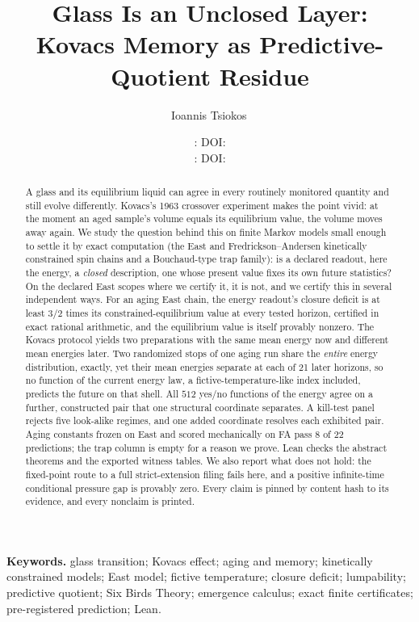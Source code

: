 \documentclass[11pt]{article}
\title{Glass Is an Unclosed Layer:\\
  Kovacs Memory as Predictive-Quotient Residue}
\author{Ioannis Tsiokos\,\orcidlink{0009-0009-7659-5964}}
\date{\manuscriptversion: \manuscriptdate\ifpaperhasdoi\quad
  DOI: \href{https://doi.org/\paperdoi}{\paperdoi}\fi\\[0.2em]
  \manuscriptfirstversion: \manuscriptfirstdate\quad
  DOI: \href{https://doi.org/\paperfirstdoi}{\paperfirstdoi}}
\theoremstyle{definition}
\begin{document}
\maketitle
\thispagestyle{firstpage}

\begin{abstract}
A glass and its equilibrium liquid can agree in every routinely monitored quantity and still
evolve differently. Kovacs's 1963 crossover experiment makes the point vivid: at the moment an
aged sample's volume equals its equilibrium value, the volume moves away again. We study the
question behind this on finite Markov models small enough to settle it by exact computation (the
East and Fredrickson--Andersen kinetically constrained spin chains and a Bouchaud-type trap
family):
is a declared readout, here the energy, a \emph{closed} description, one whose present value fixes
its own future statistics? On the declared East scopes where we certify it, it is not, and
we certify this in several independent ways. For an aging East chain, the energy readout's closure deficit
is at least $3/2$ times its constrained-equilibrium value at every tested horizon, certified in
exact rational arithmetic, and the equilibrium value is itself provably nonzero. The Kovacs
protocol yields two preparations with the same mean energy now and different mean energies
later. Two randomized stops of one aging run share the \emph{entire} energy distribution, exactly,
yet their mean energies separate at each of 21 later horizons, so no function of the current
energy law, a fictive-temperature-like index included, predicts the future on that shell. All
$512$ yes/no functions of the energy agree on a further, constructed pair that one structural
coordinate separates. A kill-test panel rejects five look-alike regimes, and one added coordinate resolves
each exhibited pair. Aging constants frozen on East and scored mechanically on FA pass 8 of 22
predictions; the trap column is empty for a reason we prove. Lean checks the abstract theorems
and the exported witness tables. We also report what does not hold: the fixed-point route to a
full strict-extension filing fails here, and a positive infinite-time conditional pressure gap
is provably zero. Every claim is pinned by content hash to its evidence, and every nonclaim is
printed.
\end{abstract}

\medskip
\noindent\textbf{Keywords.} glass transition; Kovacs effect; aging and memory; kinetically
constrained models; East model; fictive temperature; closure deficit; lumpability; predictive
quotient; Six Birds Theory; emergence calculus; exact finite certificates; pre-registered
prediction; Lean.
\end{document}

